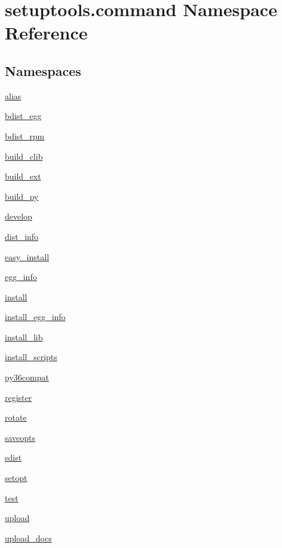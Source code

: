 \hypertarget{namespacesetuptools_1_1command}{}\section{setuptools.\+command Namespace Reference}
\label{namespacesetuptools_1_1command}
\subsection*{Namespaces}
\begin{DoxyCompactItemize}
\item 
 \hyperlink{namespacesetuptools_1_1command_1_1alias}{alias}
\item 
 \hyperlink{namespacesetuptools_1_1command_1_1bdist__egg}{bdist\+\_\+egg}
\item 
 \hyperlink{namespacesetuptools_1_1command_1_1bdist__rpm}{bdist\+\_\+rpm}
\item 
 \hyperlink{namespacesetuptools_1_1command_1_1build__clib}{build\+\_\+clib}
\item 
 \hyperlink{namespacesetuptools_1_1command_1_1build__ext}{build\+\_\+ext}
\item 
 \hyperlink{namespacesetuptools_1_1command_1_1build__py}{build\+\_\+py}
\item 
 \hyperlink{namespacesetuptools_1_1command_1_1develop}{develop}
\item 
 \hyperlink{namespacesetuptools_1_1command_1_1dist__info}{dist\+\_\+info}
\item 
 \hyperlink{namespacesetuptools_1_1command_1_1easy__install}{easy\+\_\+install}
\item 
 \hyperlink{namespacesetuptools_1_1command_1_1egg__info}{egg\+\_\+info}
\item 
 \hyperlink{namespacesetuptools_1_1command_1_1install}{install}
\item 
 \hyperlink{namespacesetuptools_1_1command_1_1install__egg__info}{install\+\_\+egg\+\_\+info}
\item 
 \hyperlink{namespacesetuptools_1_1command_1_1install__lib}{install\+\_\+lib}
\item 
 \hyperlink{namespacesetuptools_1_1command_1_1install__scripts}{install\+\_\+scripts}
\item 
 \hyperlink{namespacesetuptools_1_1command_1_1py36compat}{py36compat}
\item 
 \hyperlink{namespacesetuptools_1_1command_1_1register}{register}
\item 
 \hyperlink{namespacesetuptools_1_1command_1_1rotate}{rotate}
\item 
 \hyperlink{namespacesetuptools_1_1command_1_1saveopts}{saveopts}
\item 
 \hyperlink{namespacesetuptools_1_1command_1_1sdist}{sdist}
\item 
 \hyperlink{namespacesetuptools_1_1command_1_1setopt}{setopt}
\item 
 \hyperlink{namespacesetuptools_1_1command_1_1test}{test}
\item 
 \hyperlink{namespacesetuptools_1_1command_1_1upload}{upload}
\item 
 \hyperlink{namespacesetuptools_1_1command_1_1upload__docs}{upload\+\_\+docs}
\end{DoxyCompactItemize}
